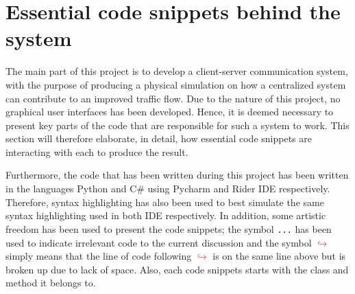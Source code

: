 \section{Essential code snippets behind the system}
The main part of this project is to develop a client-server communication system, with the purpose of producing a physical simulation on how a centralized system can contribute to an improved traffic flow. Due to the nature of this project, no graphical user interfaces has been developed. Hence, it is deemed necessary to present key parts of the code that are responsible for such a system to work. This section will therefore elaborate, in detail, how essential code snippets are interacting with each to produce the result.

Furthermore, the code that has been written during this project has been written in the languages Python and C\# using Pycharm and Rider IDE respectively. Therefore, syntax highlighting has also been used to best simulate the same syntax highlighting used in both IDE respectively. In addition, some artistic freedom has been used to present the code snippets; the symbol \verb|...| has been used to indicate irrelevant code to the current discussion and the symbol  \textcolor{red}{$\hookrightarrow$} simply means that the line of code following \textcolor{red}{$\hookrightarrow$} is on the same line above but is broken up due to lack of space. Also, each code snippets starts with the class and method it belongs to.




